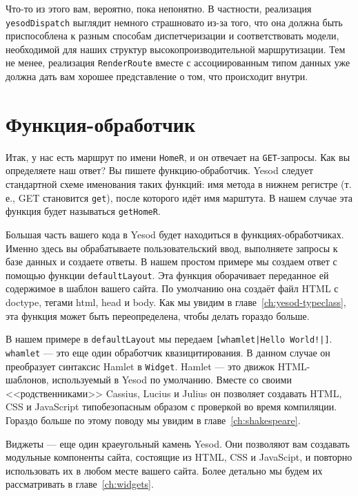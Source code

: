 Что-то из этого вам, вероятно, пока непонятно. В частности, реализация
\lstinline!yesodDispatch! выглядит немного страшновато из-за того, что она должна быть
приспособлена к разным способам диспетчеризации и соответствовать модели, необходимой для
наших структур высокопроизводительной маршрутизации. Тем не менее, реализация
\lstinline!RenderRoute! вместе с ассоциированным типом данных уже должна дать вам хорошее
представление о том, что происходит внутри.

\section{Функция-обработчик}

Итак, у нас есть маршрут по имени \lstinline!HomeR!, и он отвечает на
\texttt{GET}-запросы.  Как вы определяете наш ответ? Вы пишете
функцию-обработчик. Yesod следует стандартной схеме именования таких функций: имя
метода в нижнем регистре (т. е., GET становится \lstinline!get!), после которого
идёт имя марштута. В нашем случае эта функция будет называться \lstinline!getHomeR!.

Большая часть вашего кода в Yesod будет находиться в функциях-обработчиках.
Именно здесь вы обрабатываете пользовательский ввод, выполняете запросы к базе данных и
создаете ответы. В нашем простом примере мы создаем ответ с помощью функции
\lstinline!defaultLayout!. Эта функция оборачивает переданное ей содержимое в шаблон
вашего сайта. По умолчанию она создаёт файл HTML с doctype, тегами html, head и
body. Как мы увидим в главе~\ref{ch:yesod-typeclass}, эта функция может быть
переопределена, чтобы делать гораздо больше.

В нашем примере в \lstinline!defaultLayout! мы передаем
\lstinline'[whamlet|Hello World!|]'. \lstinline!whamlet! --- это еще один обработчик
квазицитирования. В данном случае он преобразует синтаксис Hamlet в
\texttt{Widget}. Hamlet --- это движок HTML-шаблонов, используемый в Yesod по умолчанию.
Вместе со своими <<родственниками>> Cassius, Lucius и Julius он позволяет создавать HTML,
CSS и JavaScript типобезопасным образом с проверкой во время компиляции. Гораздо больше по
этому поводу мы увидим в главе~\ref{ch:shakespeare}.

Виджеты --- еще один краеугольный камень Yesod. Они позволяют вам создавать
модульные компоненты сайта, состоящие из HTML, CSS и JavaScipt,
и повторно использовать их в любом месте вашего сайта. Более детально мы будем их
рассматривать в главе~\ref{ch:widgets}.

